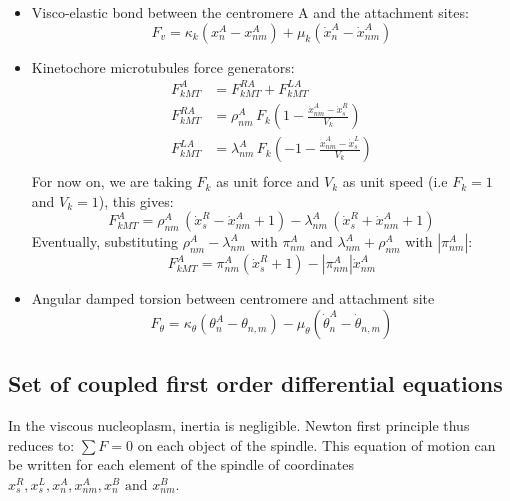 \documentclass[a4paper,12pt]{article}
\begin{document}
\begin{itemize}
\item Visco-elastic bond between the centromere A and the
  attachment sites:
  $$F_v =  \kappa_k(x_n^A - x_{nm}^A)
  + \mu_k(\dot{x}_n^A - \dot{x}_{nm}^A) $$
\item Kinetochore microtubules force generators:
  \begin{equation}
    \begin{aligned}
      F_{kMT}^A &= F_{kMT}^{RA} + F_{kMT}^{LA}\\
      F_{kMT}^{RA} &= \rho_{nm}^A\,F_k\left(1 - \frac{\dot{x}^A_{nm} -
          \dot{x}^R_s}{V_k}\right)\\
      F_{kMT}^{LA} &=  \lambda_{nm}^A\,F_k\left(-1 - \frac{\dot{x}^A_{nm} -
          \dot{x}^L_s}{V_k}\right)\\
    \end{aligned}
  \end{equation}
  For now on, we are taking $F_k$ as unit force and $V_k$ as unit speed (i.e $F_k = 1$ and $ V_k = 1$), this gives:
  \begin{equation}
    F_{kMT}^A = \rho_{nm}^A\,\left(\dot{x}^R_s - \dot{x}^A_{nm} + 1\right)%
    - \lambda_{nm}^A\,\left(\dot{x}^R_s + \dot{x}^A_{nm} + 1\right)
  \end{equation}
  Eventually, substituting $\rho^A_{nm} - \lambda^A_{nm}$ with
  $\pi_{nm}^A$ and $\lambda^A_{nm} + \rho^A_{nm}$ with $|\pi_{nm}^A|$:
  \begin{equation}
    F_{kMT}^A =  \pi_{nm}^A(\dot{x}^R_s + 1) - |\pi_{nm}^A|\dot{x}^A_{nm}
  \end{equation}
\item Angular damped torsion between centromere and attachment site
  $$ F_\theta = \kappa_\theta(\theta_n^A - \theta_{n,m})
  - \mu_\theta \left(\dot{\theta}_n^A - \dot{\theta}_{n,m} \right) $$
\end{itemize}

\newpage

\subsection{Set of coupled first order differential equations}

In the viscous nucleoplasm, inertia is negligible. Newton first
principle thus reduces to: $ \sum F = 0 $ on each object of the spindle. This equation of motion
can be written for each element of the spindle of coordinates $x_s^R, x_s^L, x_n^A, x_{nm}^A,  x_n^B  \mbox{ and }
  x_{nm}^B $.
\end{document}
